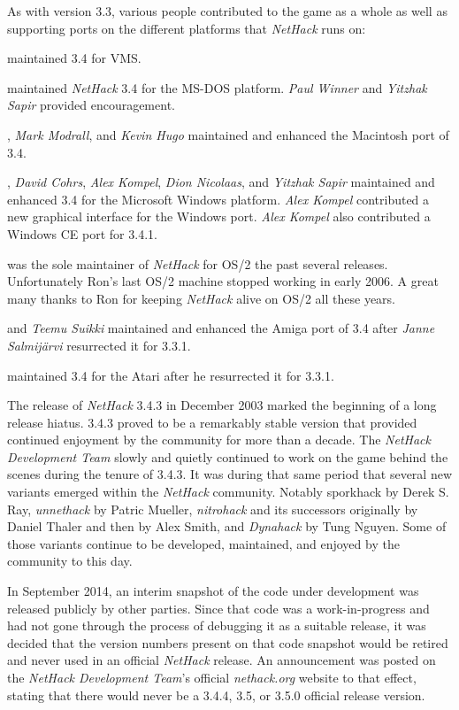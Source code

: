 \medskip
As with version 3.3, various people contributed to the game as a whole as
well as supporting ports on the different platforms that {\it NetHack\/}
runs on:

\medskip
{} maintained 3.4 for VMS.

\medskip
{} maintained {\it NetHack\/} 3.4 for the MS-DOS
platform.
{\it Paul Winner} and {\it Yitzhak Sapir} provided encouragement.

\medskip
{}, {\it Mark Modrall}, and {\it Kevin Hugo} maintained and
enhanced the Macintosh port of 3.4.

\medskip
{}, {\it David Cohrs}, {\it Alex Kompel},
{\it Dion Nicolaas}, and
{\it Yitzhak Sapir} maintained and enhanced 3.4 for the Microsoft Windows
platform.
{\it Alex Kompel} contributed a new graphical interface for the Windows port.
{\it Alex Kompel} also contributed a Windows CE port for 3.4.1.

\medskip
{} was the sole maintainer of {\it NetHack\/} for
OS/2 the past
several releases. Unfortunately Ron's last OS/2 machine stopped working in
early 2006. A great many thanks to Ron for keeping {\it NetHack\/} alive on
OS/2 all these years.

\medskip
{} and {\it Teemu Suikki} maintained
and enhanced the Amiga port of 3.4 after {\it Janne Salmij\"{a}rvi} resurrected
it for 3.3.1.

\medskip
{} maintained 3.4 for the Atari after he
resurrected it for 3.3.1.

\medskip
The release of {\it NetHack\/} 3.4.3 in December 2003 marked the beginning of
a long release hiatus. 3.4.3 proved to be a remarkably stable version that
provided continued enjoyment by the community for more than a decade. The
{\it NetHack Development Team} slowly and quietly continued to work on the game behind the scenes
during the tenure of 3.4.3. It was during that same period that several new
variants emerged within the {\it NetHack\/} community. Notably sporkhack by
Derek S. Ray, {\it unnethack\/} by Patric Mueller, {\it nitrohack\/} and its
successors originally by Daniel Thaler and then by Alex Smith, and
{\it Dynahack\/} by Tung Nguyen. Some of those variants continue to be
developed, maintained, and enjoyed by the community to this day.

\medskip
In September 2014, an interim snapshot of the code under development was
released publicly by other parties. Since that code was a work-in-progress
and had not gone through the process of debugging it as a suitable release,
it was decided that the version numbers present on that code snapshot would
be retired and never used in an official {\it NetHack\/} release. An
announcement was posted on the {\it NetHack Development Team}'s official {\it nethack.org\/} website
to that effect, stating that there would never be a 3.4.4, 3.5, or 3.5.0
official release version.

